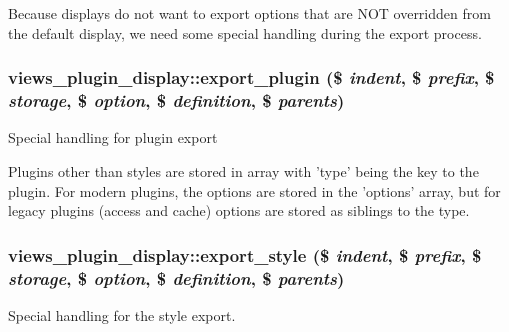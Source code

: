 Because displays do not want to export options that are NOT overridden from the default display, we need some special handling during the export process. \hypertarget{classviews__plugin__display_a1f54cc568f4f0968aea8ad74c5d6bc8d}{
\subsubsection[{export\_\-plugin}]{\setlength{\rightskip}{0pt plus 5cm}views\_\-plugin\_\-display::export\_\-plugin (\$ {\em indent}, \/  \$ {\em prefix}, \/  \$ {\em storage}, \/  \$ {\em option}, \/  \$ {\em definition}, \/  \$ {\em parents})}}
\label{classviews__plugin__display_a1f54cc568f4f0968aea8ad74c5d6bc8d}
Special handling for plugin export

Plugins other than styles are stored in array with 'type' being the key to the plugin. For modern plugins, the options are stored in the 'options' array, but for legacy plugins (access and cache) options are stored as siblings to the type. \hypertarget{classviews__plugin__display_ace03a36c988cd15555f87bedc13db304}{
\subsubsection[{export\_\-style}]{\setlength{\rightskip}{0pt plus 5cm}views\_\-plugin\_\-display::export\_\-style (\$ {\em indent}, \/  \$ {\em prefix}, \/  \$ {\em storage}, \/  \$ {\em option}, \/  \$ {\em definition}, \/  \$ {\em parents})}}
\label{classviews__plugin__display_ace03a36c988cd15555f87bedc13db304}
Special handling for the style export.

